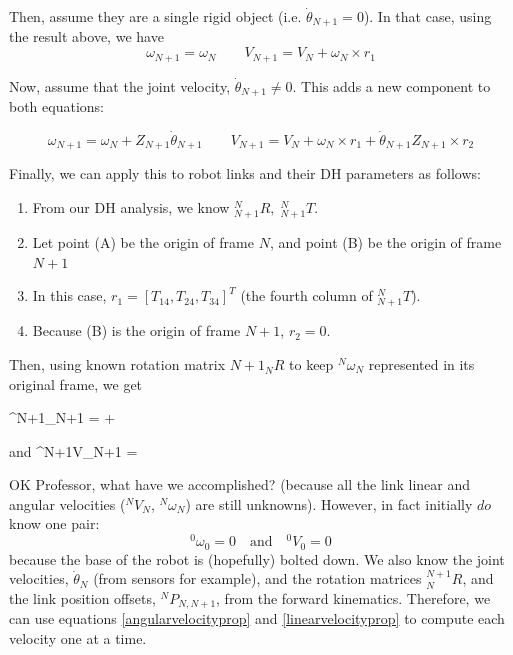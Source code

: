 Then, assume they are a single rigid object (i.e. $\dot{\theta}_{N+1}=0$).
In that case, using the result above, we have
\[
\omega_{N+1} = \omega_N      \qquad     V_{N+1} = V_N + \omega_N\times r_1
\]

Now, assume that the joint velocity, $\dot{\theta}_{N+1} \ne 0$.  This adds a new component to both equations:


\[
\omega_{N+1} = \omega_N + Z_{N+1}\dot{\theta}_{N+1}     \qquad     V_{N+1} = V_N + \omega_N\times r_1 + \dot{\theta}_{N+1}Z_{N+1}\times r_2
\]

Finally, we can apply this to robot links and their DH parameters as follows:

\begin{enumerate}
  \item From our DH analysis, we know ${^N_{N+1}R},\; {^N_{N+1}T}$.
  \item Let point (A) be the origin of frame $N$, and point (B) be the origin of frame $N+1$
  \item In this case, $r_1 = [T_{14}, T_{24}, T_{34}]^T$ (the fourth column of ${^N_{N+1}T}$).
  \item Because (B) is the origin of frame $N+1$, $r_2 = 0$.
\end{enumerate}

Then, using known rotation matrix ${N+1}_NR$ to keep $^N\omega_N$ represented in its original frame, 
we get
 
\beq\label{angularvelocityprop}
^{N+1}\omega_{N+1} =  +
\eeq

and
\beq\label{linearvelocityprop}
^{N+1}V_{N+1} =
\eeq

OK Professor, what have we accomplished? (because all the link linear and angular velocities ($^NV_N$, $^N\omega_N$) are still unknowns).   However, in fact initially $do$ know one pair:
\[
^0\omega_0 = 0 \quad \mathrm{and}  \quad ^0V_0 = 0
\] 
because the base of the robot is (hopefully) bolted down.   We also know
the joint velocities, $\dot\theta_N$ (from sensors for example), and the rotation matrices
$^{N+1}_NR$, and the link position offsets, $^NP_{N,N+1}$, from the forward kinematics.
Therefore, we can use equations \ref{angularvelocityprop} and \ref{linearvelocityprop} to compute each velocity one at a time.


